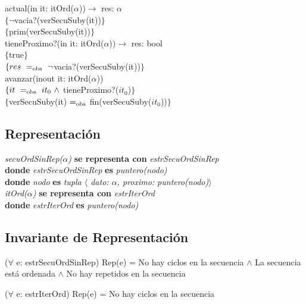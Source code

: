 actual(in it: itOrd($\alpha$))$\longrightarrow$ res: $\alpha$\\
$\{\neg$vacia?(verSecuSuby(it))$\}$\\
$\{$prim(verSecuSuby(it))$\}$\\

tieneProximo?(in it: itOrd($\alpha$))$\longrightarrow$ res: bool\\
$\{$true$\}$\\
$\{\sombreritoWide{res}\ \igobs\ \neg$vacia?(verSecuSuby(it))$\}$\\

avanzar(inout it: itOrd($\alpha$))\\
$\{\sombreritoWide{it}\ \igobs\ it_0\ \wedge$ tieneProximo?($it_0$)$\}$\\
$\{$verSecuSuby(it) $=_{\mathrm{obs}}$ fin(verSecuSuby($it_0$))$\}$\\


\subsection*{Representaci\'on}
\textit{secuOrdSinRep($\alpha$)} \textbf{se representa con} \textit{estrSecuOrdSinRep}\\
\textbf{donde} \textit{estrSecuOrdSinRep} \textbf{es} \textit{puntero(nodo)}\\
\textbf{donde} \textit{nodo} \textbf{es} \textit{tupla $\langle$ dato: $\alpha$, proximo: puntero(nodo)$\rangle$}\\

\textit{itOrd($\alpha$)} \textbf{se representa con} \textit{estrIterOrd}\\
\textbf{donde} \textit{estrIterOrd} \textbf{es} \textit{puntero(nodo)}\\

\subsection*{Invariante de Representaci\'on}
\vspace{11pt}
($\forall$ e: estrSecuOrdSinRep) Rep(e) = No hay ciclos en la secuencia $\wedge$ La secuencia est\'a ordenada $\wedge$ No hay repetidos en la secuencia

\vspace{22pt}

\vspace{11pt}
($\forall$ e: estrIterOrd) Rep(e) = No hay ciclos en la secuencia

